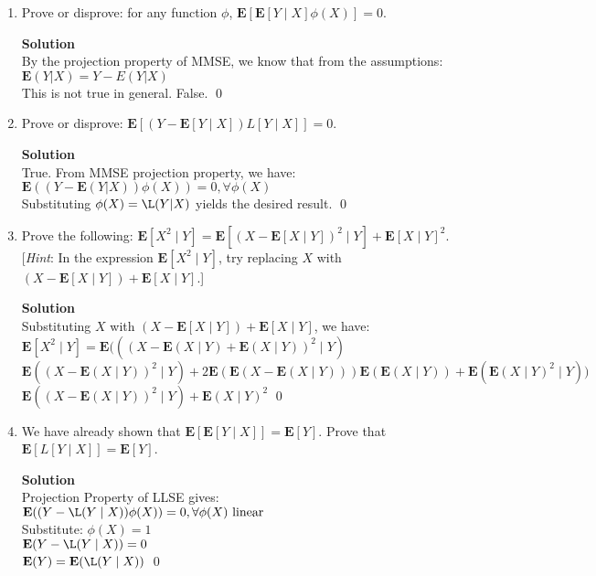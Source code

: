 \documentclass[11pt]{article}
\newenvironment{Parts}{\begin{enumerate}[label=(\alph*)]}{\end{enumerate}}
\newcommand*{\Part}{\item}
\newenvironment{Answer}{\vspace{10pt}\begin{mdframed}\textbf{Solution}\\}{\end{mdframed}\vfill\pagebreak[3]}
\newenvironment{Answer}{\vspace{10pt}}{\vfill\pagebreak[3]}
\newcommand*{\E}{\textbf{E}}
\begin{document}
\begin{Parts}
  \Part Prove or disprove: for any function $\phi$, $\E[\E[Y \mid X] \phi(X)] = 0$.
  \begin{Answer}
By the projection property of MMSE, we know that from the assumptions: \\
$\E(Y|X) = Y-E(Y|X)$\\
This is not true in general. False. \qed
  \end{Answer}

  \Part Prove or disprove: $\E[(Y - \E[Y \mid X]) L[Y \mid X]] = 0$.
  \begin{Answer}
True. From MMSE projection property, we have:\\
$\E((Y-\E(Y|X))\phi(X))=0, \forall \phi(X)$\\
Substituting $\phi(X)=\L(Y|X)$ yields the desired result. \qed
  \end{Answer}
  
  \Part Prove the following: $\E[X^2 \mid Y] = \E[(X - \E[X \mid Y])^2 \mid Y] + \E[X \mid Y]^2$. [\textit{Hint}: In the expression $\E[X^2 \mid Y]$, try replacing $X$ with $(X - \E[X \mid Y]) + \E[X \mid Y]$.]
  \begin{Answer}
Substituting $X$ with $(X - \E[X \mid Y]) + \E[X \mid Y]$, we have: \\
$\E[X^2 \mid Y] = \E(((X-\E(X \mid Y)+\E(X \mid Y))^2 \mid Y)$\\
$\E((X-\E(X \mid Y))^2 \mid Y)+2\E(\E(X-\E(X \mid Y)))\E(\E(X \mid Y))+\E(\E(X \mid Y)^2 \mid Y))$\\
$\E((X-\E(X \mid Y))^2 \mid Y)+\E(X \mid Y)^2$ \qed
  \end{Answer}
  
  \Part We have already shown that $\E[\E[Y \mid X]] = \E[Y]$. Prove that $\E[L[Y \mid X]] = \E[Y]$.
  \begin{Answer}
Projection Property of LLSE gives: \\
$\E((Y-\L(Y \mid X))\phi(X))=0, \forall \phi(X) \text{ linear}$\\
Substitute: $\phi(X)=1$\\
$\E(Y-\L(Y \mid X))=0$\\
$\E(Y)=\E(\L(Y \mid X))$ \qed
  \end{Answer}


\end{Parts}
\end{document}
